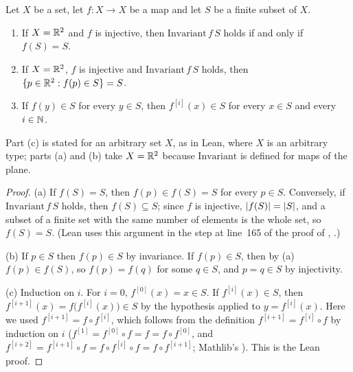 \begin{lemma}\label{fd:lem:inv-image}\sloppy
Let $X$ be a set, let $f\colon X\to X$ be a map and let $S$ be a finite subset of $X$.
\begin{enumerate}[label=(\alph*)]
\item If $X=\mathbb R^2$ and $f$ is injective, then $\mathrm{Invariant}\,f\,S$ holds if and only if $f(S)=S$.
\item If $X=\mathbb R^2$, $f$ is injective and $\mathrm{Invariant}\,f\,S$ holds, then $\{p\in\mathbb R^2:f(p)\in S\}=S$.
\item If $f(y)\in S$ for every $y\in S$, then $f^{[i]}(x)\in S$ for every $x\in S$ and every $i\in\mathbb N$.
\end{enumerate}
Part (c) is stated for an arbitrary set $X$, as in Lean, where $X$ is an arbitrary type; parts (a) and
(b) take $X=\mathbb R^2$ because $\mathrm{Invariant}$ is defined for maps of the plane.
\end{lemma}

\begin{proof}
(a) If $f(S)=S$, then $f(p)\in f(S)=S$ for every $p\in S$. Conversely, if $\mathrm{Invariant}\,f\,S$
holds, then $f(S)\subseteq S$; since $f$ is injective, $\lvert f(S)\rvert=\lvert S\rvert$, and a subset of a finite
set with the same number of elements is the whole set, so $f(S)=S$. (Lean uses this argument in the step
at line~165 of the proof of ,
.)

(b) If $p\in S$ then $f(p)\in S$ by invariance. If $f(p)\in S$, then by (a) $f(p)\in f(S)$, so
$f(p)=f(q)$ for some $q\in S$, and $p=q\in S$ by injectivity.

(c) Induction on $i$. For $i=0$, $f^{[0]}(x)=x\in S$. If $f^{[i]}(x)\in S$, then
$f^{[i+1]}(x)=f\bigl(f^{[i]}(x)\bigr)\in S$ by the hypothesis applied to $y=f^{[i]}(x)$. Here we used
$f^{[i+1]}=f\circ f^{[i]}$, which follows from the definition $f^{[i+1]}=f^{[i]}\circ f$ by induction on
$i$ ($f^{[1]}=f^{[0]}\circ f=f=f\circ f^{[0]}$, and $f^{[i+2]}=f^{[i+1]}\circ f=f\circ f^{[i]}\circ
f=f\circ f^{[i+1]}$; Mathlib's ). This is the Lean proof.
\end{proof}

